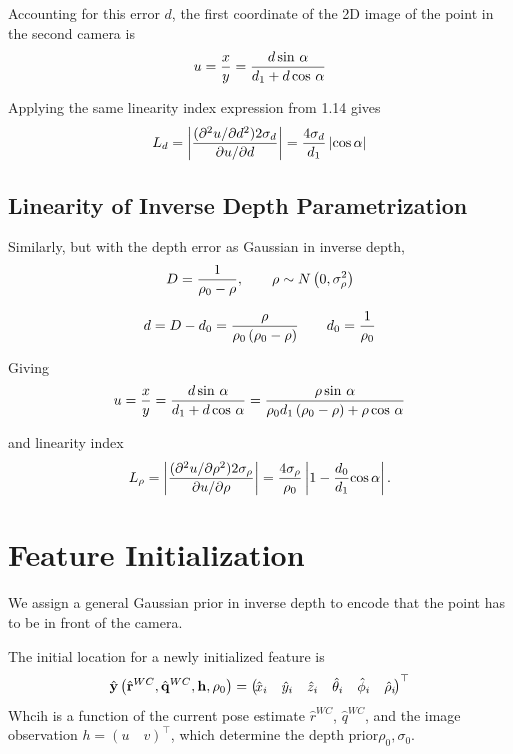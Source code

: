 \documentclass[twoside]{article}
\begin{document}
Accounting for this error $d$, the first coordinate of the 2D image of the point in the second camera is
\begin{equation}
u = {x \over y}={d\sin\,\alpha \over d_1 + d\cos\,\alpha} 
\end{equation}

Applying the same linearity index expression from 1.14 gives
\begin{equation}
L_d = \left\vert {{(\partial^2 u/ \partial d^2)}2\sigma_d\over {\partial u/ \partial d}}\right\vert ={4\sigma_d\over d_1}\left\vert {\rm cos}\,\alpha\right\vert 
\end{equation}

\subsection*{Linearity of Inverse Depth Parametrization}
Similarly, but with the depth error as Gaussian in inverse depth,
\begin{equation}
D = {1 \over \rho_0-\rho}, \qquad\rho \sim N\left(0,\sigma_\rho^2\right) 
\end{equation}

\begin{equation}
 d= D-d_0 = {\rho \over \rho_0\left(\rho_0-\rho\right)}\qquad d_0 = {1 \over \rho_0}
\end{equation}

Giving
\begin{equation}
u = {x \over y}={d\sin\,\alpha \over d_1+d\cos\,\alpha}={\rho\sin\,\alpha \over \rho_0 d_1\left(\rho_0-\rho\right)+ \rho\cos\,\alpha } 
\end{equation}

and linearity index
\begin{equation}
L_\rho = \left\vert {{(\partial^2 u/ \partial \rho^2)}2\sigma_\rho\over {\partial u / \partial \rho}}\right\vert ={4\sigma_\rho \over \rho_0}\left\vert 1- {d_0 \over d_1}{\rm cos}\,\alpha\right\vert .
\end{equation}

\section{Feature Initialization}
We assign a general Gaussian prior in inverse depth to encode that the point has to be in front of the camera.

The initial location for a newly initialized feature is
\begin{equation}
\hat{{\bf y}}\left(\hat{{\bf r}}^{WC}, \hat{{\bf q}}^{WC}, {\bf h}, \rho_0\right)=\left(\!\begin{matrix}\hat{x}_i & \hat{y}_i & \hat{z}_i & \hat{\theta}_i & \hat{\phi}_i & \hat{\rho}_i\end{matrix}\!\right)^\top 
\end{equation}
Whcih is a function of the current pose estimate $\hat{r}^{WC}$, $\hat{q}^{WC}$, and the image observation $h = (u \quad v)^\top$, which determine the depth prior$\rho_0, \sigma_0$. 
\end{document}
